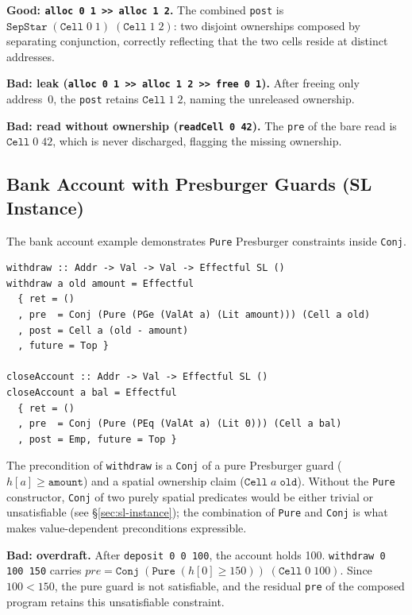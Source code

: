 \documentclass[acmsmall,screen]{acmart}
\newcommand{\pre}{\mathit{pre}}
\begin{document}
\noindent
\textbf{Good: \lstinline{alloc 0 1 >> alloc 1 2}.}
The combined \lstinline{post} is
$\mathtt{SepStar}\;(\mathtt{Cell}\;0\;1)\;(\mathtt{Cell}\;1\;2)$:
two disjoint ownerships composed by separating conjunction,
correctly reflecting that the two cells reside at distinct addresses.

\noindent
\textbf{Bad: leak (\lstinline{alloc 0 1 >> alloc 1 2 >> free 0 1}).}
After freeing only address~0, the \lstinline{post} retains
$\mathtt{Cell}\;1\;2$, naming the unreleased ownership.

\noindent
\textbf{Bad: read without ownership (\lstinline{readCell 0 42}).}
The \lstinline{pre} of the bare read is $\mathtt{Cell}\;0\;42$,
which is never discharged, flagging the missing ownership.

\subsection{Bank Account with Presburger Guards (SL Instance)}
\label{sec:ex-bank}

The bank account example demonstrates \lstinline{Pure} Presburger
constraints inside \lstinline{Conj}.

\begin{lstlisting}
withdraw :: Addr -> Val -> Val -> Effectful SL ()
withdraw a old amount = Effectful
  { ret = ()
  , pre  = Conj (Pure (PGe (ValAt a) (Lit amount))) (Cell a old)
  , post = Cell a (old - amount)
  , future = Top }

closeAccount :: Addr -> Val -> Effectful SL ()
closeAccount a bal = Effectful
  { ret = ()
  , pre  = Conj (Pure (PEq (ValAt a) (Lit 0))) (Cell a bal)
  , post = Emp, future = Top }
\end{lstlisting}

\noindent
The precondition of \lstinline{withdraw} is a \lstinline{Conj} of a pure
Presburger guard ($h[a] \geq \mathtt{amount}$) and a spatial ownership
claim ($\mathtt{Cell}\;a\;\mathtt{old}$).
Without the \lstinline{Pure} constructor, \lstinline{Conj} of two purely
spatial predicates would be either trivial or unsatisfiable (see
\S\ref{sec:sl-instance}); the combination of \lstinline{Pure} and
\lstinline{Conj} is what makes value-dependent preconditions expressible.

\noindent
\textbf{Bad: overdraft.}
After \lstinline{deposit 0 0 100}, the account holds 100.
\lstinline{withdraw 0 100 150} carries
$\pre = \mathtt{Conj}\;(\mathtt{Pure}\;(h[0] \geq 150))\;(\mathtt{Cell}\;0\;100)$.
Since $100 < 150$, the pure guard is not satisfiable, and the residual
\lstinline{pre} of the composed program retains this unsatisfiable constraint.
\end{document}
